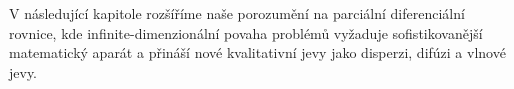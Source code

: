 \begin{transition}
V následující kapitole rozšíříme naše porozumění na parciální diferenciální rovnice, kde infinite-dimenzionální povaha problémů vyžaduje sofistikovanější matematický aparát a přináší nové kvalitativní jevy jako disperzi, difúzi a vlnové jevy.
\end{transition}

\spc